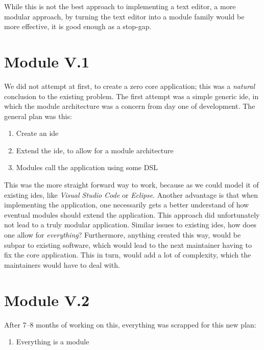 While this is not the best approach to implementing a text editor, a more
modular approach, by turning the text editor into a module family would be more
effective, it is good enough as a stop-gap.

\section{Module V.1}

We did not attempt at first, to create a zero core application; this was a
\textit{natural} conclusion to the existing problem. The first attempt was a
simple generic \gls{ide}, in which the module architecture was a concern from
day one of development. The general plan was this:

\begin{enumerate}
  \item Create an \gls{ide}
  \item Extend the \gls{ide}, to allow for a module architecture
  \item Modules call the application using some DSL
\end{enumerate}

This was the more straight forward way to work, because as we could model it of
existing \gls{ide}s, like \textit{Visual Studio Code} or \textit{Eclipse}.
Another advantage is that when implementing the application, one necessarily
gets a better understand of how eventual modules should extend the application.
This approach did unfortunately not lead to a truly modular application. Similar
issues to existing \gls{ide}s, how does one allow for \textit{everything}?
Furthermore, anything created this way, would be subpar to existing software,
which would lead to the next maintainer having to fix the core application. This
in turn, would add a lot of complexity, which the maintainers would have to deal with.

\section{Module V.2}


After 7–8 months of working on this, everything was scrapped for this new plan:

\begin{enumerate}
  \item Everything is a module
\end{enumerate}

